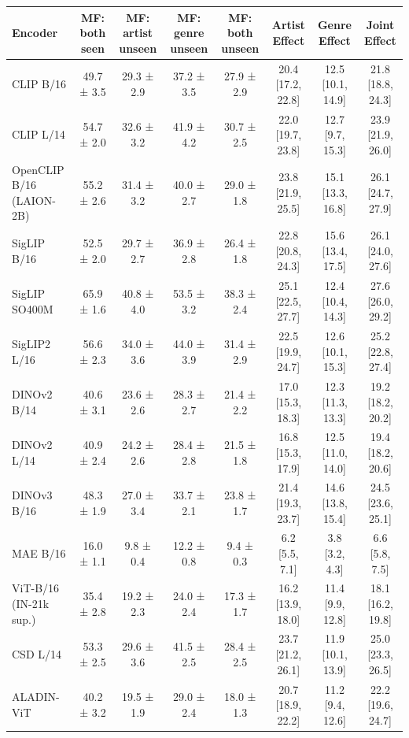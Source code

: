 \begin{tabular}{lccccccc}
\toprule
Encoder & MF: both seen & MF: artist unseen & MF: genre unseen & MF: both unseen & Artist Effect & Genre Effect & Joint Effect \\
\midrule
CLIP B/16 & 49.7 ± 3.5 & 29.3 ± 2.9 & 37.2 ± 3.5 & 27.9 ± 2.9 & 20.4 [17.2, 22.8] & 12.5 [10.1, 14.9] & 21.8 [18.8, 24.3] \\
CLIP L/14 & 54.7 ± 2.0 & 32.6 ± 3.2 & 41.9 ± 4.2 & 30.7 ± 2.5 & 22.0 [19.7, 23.8] & 12.7 [9.7, 15.3] & 23.9 [21.9, 26.0] \\
OpenCLIP B/16 (LAION-2B) & 55.2 ± 2.6 & 31.4 ± 3.2 & 40.0 ± 2.7 & 29.0 ± 1.8 & 23.8 [21.9, 25.5] & 15.1 [13.3, 16.8] & 26.1 [24.7, 27.9] \\
SigLIP B/16 & 52.5 ± 2.0 & 29.7 ± 2.7 & 36.9 ± 2.8 & 26.4 ± 1.8 & 22.8 [20.8, 24.3] & 15.6 [13.4, 17.5] & 26.1 [24.0, 27.6] \\
SigLIP SO400M & 65.9 ± 1.6 & 40.8 ± 4.0 & 53.5 ± 3.2 & 38.3 ± 2.4 & 25.1 [22.5, 27.7] & 12.4 [10.4, 14.3] & 27.6 [26.0, 29.2] \\
SigLIP2 L/16 & 56.6 ± 2.3 & 34.0 ± 3.6 & 44.0 ± 3.9 & 31.4 ± 2.9 & 22.5 [19.9, 24.7] & 12.6 [10.1, 15.3] & 25.2 [22.8, 27.4] \\
DINOv2 B/14 & 40.6 ± 3.1 & 23.6 ± 2.6 & 28.3 ± 2.7 & 21.4 ± 2.2 & 17.0 [15.3, 18.3] & 12.3 [11.3, 13.3] & 19.2 [18.2, 20.2] \\
DINOv2 L/14 & 40.9 ± 2.4 & 24.2 ± 2.6 & 28.4 ± 2.8 & 21.5 ± 1.8 & 16.8 [15.3, 17.9] & 12.5 [11.0, 14.0] & 19.4 [18.2, 20.6] \\
DINOv3 B/16 & 48.3 ± 1.9 & 27.0 ± 3.4 & 33.7 ± 2.1 & 23.8 ± 1.7 & 21.4 [19.3, 23.7] & 14.6 [13.8, 15.4] & 24.5 [23.6, 25.1] \\
MAE B/16 & 16.0 ± 1.1 & 9.8 ± 0.4 & 12.2 ± 0.8 & 9.4 ± 0.3 & 6.2 [5.5, 7.1] & 3.8 [3.2, 4.3] & 6.6 [5.8, 7.5] \\
ViT-B/16 (IN-21k sup.) & 35.4 ± 2.8 & 19.2 ± 2.3 & 24.0 ± 2.4 & 17.3 ± 1.7 & 16.2 [13.9, 18.0] & 11.4 [9.9, 12.8] & 18.1 [16.2, 19.8] \\
CSD L/14 & 53.3 ± 2.5 & 29.6 ± 3.6 & 41.5 ± 2.5 & 28.4 ± 2.5 & 23.7 [21.2, 26.1] & 11.9 [10.1, 13.9] & 25.0 [23.3, 26.5] \\
ALADIN-ViT & 40.2 ± 3.2 & 19.5 ± 1.9 & 29.0 ± 2.4 & 18.0 ± 1.3 & 20.7 [18.9, 22.2] & 11.2 [9.4, 12.6] & 22.2 [19.6, 24.7] \\
\bottomrule
\end{tabular}
